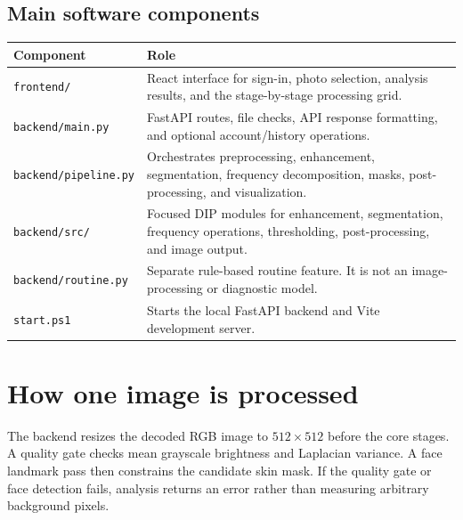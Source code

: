 \documentclass[11pt,a4paper]{article}
\begin{document}
\subsection{Main software components}
\begin{tabularx}{\textwidth}{@{}p{}X@{}}
\toprule
\textbf{Component} & \textbf{Role} \\
\midrule
\texttt{frontend/} & React interface for sign-in, photo selection, analysis results, and the stage-by-stage processing grid. \\
\texttt{backend/main.py} & FastAPI routes, file checks, API response formatting, and optional account/history operations. \\
\texttt{backend/pipeline.py} & Orchestrates preprocessing, enhancement, segmentation, frequency decomposition, masks, post-processing, and visualization. \\
\texttt{backend/src/} & Focused DIP modules for enhancement, segmentation, frequency operations, thresholding, post-processing, and image output. \\
\texttt{backend/routine.py} & Separate rule-based routine feature. It is not an image-processing or diagnostic model. \\
\texttt{start.ps1} & Starts the local FastAPI backend and Vite development server. \\
\bottomrule
\end{tabularx}

\section{How one image is processed}

The backend resizes the decoded RGB image to $512\times512$ before the core stages. A quality gate checks mean grayscale brightness and Laplacian variance. A face landmark pass then constrains the candidate skin mask. If the quality gate or face detection fails, analysis returns an error rather than measuring arbitrary background pixels.
\end{document}
